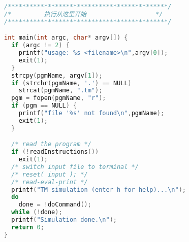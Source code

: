 \documentclass[lang=cn,10pt]{elegantbook}
\begin{document}
\begin{lstlisting}[caption={tm.c},language=c]
/********************************************/
/*         执行从这里开始                   */
/********************************************/

int main(int argc, char* argv[]) {
  if (argc != 2) {
    printf("usage: %s <filename>\n",argv[0]);
    exit(1);
  }
  strcpy(pgmName, argv[1]);
  if (strchr(pgmName, '.') == NULL)
    strcat(pgmName, ".tm");
  pgm = fopen(pgmName, "r");
  if (pgm == NULL) {
    printf("file '%s' not found\n",pgmName);
    exit(1);
  }

  /* read the program */
  if (!readInstructions())
    exit(1);
  /* switch input file to terminal */
  /* reset( input ); */
  /* read-eval-print */
  printf("TM simulation (enter h for help)...\n");
  do
    done = !doCommand();
  while (!done);
  printf("Simulation done.\n");
  return 0;
}
\end{lstlisting}

\nocite{*}
\printbibliography[heading=bibintoc, title=\ebibname]

\clearpage
\printglossary[title={术语表},toctitle={术语表}]
\end{document}
